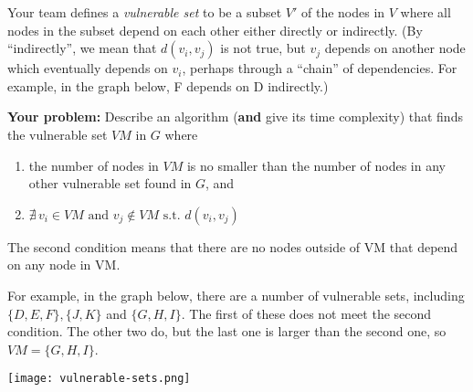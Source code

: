 \documentclass[10pt]{article}
\begin{document}
Your team defines a \emph{vulnerable set} to be a subset $V'$ of the nodes in $V$ where all nodes in the subset depend on each other either directly or indirectly. (By ``indirectly'', we mean that $d(v_i, v_j)$ is not true, but $v_j$ depends on another node which eventually depends on $v_i$, perhaps through a ``chain'' of dependencies. For example, in the graph below, F depends on D indirectly.) 

\textbf{Your problem:}  Describe an algorithm (\textbf{and} give its time complexity) that finds the vulnerable set $VM$ in $G$ where 
\begin{enumerate}
\item the number of nodes in $VM$ is no smaller than the number of nodes in any other vulnerable set found in $G$, and
\item $\nexists \, v_i \in VM \textrm{ and } v_j \notin VM \textrm{ s.t. } d(v_i, v_j)$
\end{enumerate}
The second condition means that there are no nodes outside of VM that depend on any node in VM.

For example, in the graph below, there are a number of vulnerable sets, including $\{D, E, F\}, \{J, K\}$ and $\{G, H, I\}$.   The first of these does not meet the second condition. The other two do, but the last one is larger than the second one, so $VM=\{G, H, I\}$.

 
 \texttt{[image: vulnerable-sets.png]}
\end{document}

